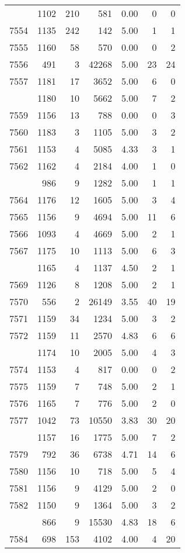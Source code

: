 \documentclass[
]{article}
\begin{document}
\begin{table}
\begin{tabular}[t]{lrrrrrr}
\addlinespace
7553 & 1102 & 210 & 581 & 0.00 & 0 & 0\\
7554 & 1135 & 242 & 142 & 5.00 & 1 & 1\\
7555 & 1160 & 58 & 570 & 0.00 & 0 & 2\\
7556 & 491 & 3 & 42268 & 5.00 & 23 & 24\\
7557 & 1181 & 17 & 3652 & 5.00 & 6 & 0\\
\addlinespace
7558 & 1180 & 10 & 5662 & 5.00 & 7 & 2\\
7559 & 1156 & 13 & 788 & 0.00 & 0 & 3\\
7560 & 1183 & 3 & 1105 & 5.00 & 3 & 2\\
7561 & 1153 & 4 & 5085 & 4.33 & 3 & 1\\
7562 & 1162 & 4 & 2184 & 4.00 & 1 & 0\\
\addlinespace
7563 & 986 & 9 & 1282 & 5.00 & 1 & 1\\
7564 & 1176 & 12 & 1605 & 5.00 & 3 & 4\\
7565 & 1156 & 9 & 4694 & 5.00 & 11 & 6\\
7566 & 1093 & 4 & 4669 & 5.00 & 2 & 1\\
7567 & 1175 & 10 & 1113 & 5.00 & 6 & 3\\
\addlinespace
7568 & 1165 & 4 & 1137 & 4.50 & 2 & 1\\
7569 & 1126 & 8 & 1208 & 5.00 & 2 & 1\\
7570 & 556 & 2 & 26149 & 3.55 & 40 & 19\\
7571 & 1159 & 34 & 1234 & 5.00 & 3 & 2\\
7572 & 1159 & 11 & 2570 & 4.83 & 6 & 6\\
\addlinespace
7573 & 1174 & 10 & 2005 & 5.00 & 4 & 3\\
7574 & 1153 & 4 & 817 & 0.00 & 0 & 2\\
7575 & 1159 & 7 & 748 & 5.00 & 2 & 1\\
7576 & 1165 & 7 & 776 & 5.00 & 2 & 0\\
7577 & 1042 & 73 & 10550 & 3.83 & 30 & 20\\
\addlinespace
7578 & 1157 & 16 & 1775 & 5.00 & 7 & 2\\
7579 & 792 & 36 & 6738 & 4.71 & 14 & 6\\
7580 & 1156 & 10 & 718 & 5.00 & 5 & 4\\
7581 & 1156 & 9 & 4129 & 5.00 & 2 & 0\\
7582 & 1150 & 9 & 1364 & 5.00 & 3 & 2\\
\addlinespace
7583 & 866 & 9 & 15530 & 4.83 & 18 & 6\\
7584 & 698 & 153 & 4102 & 4.00 & 4 & 20\\

\end{tabular}
\end{table}
\end{document}
